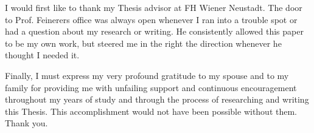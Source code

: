 I would first like to thank my Thesis advisor \advisor{} at FH Wiener Neustadt. 
The door to Prof. Feinerers office was always open whenever I ran into a trouble spot or had a question about my research or writing. 
He consistently allowed this paper to be my own work, but steered me in the right the direction whenever he thought I needed it.

Finally, I must express my very profound gratitude to my spouse and to my family for providing me with unfailing support and continuous encouragement throughout my years of study and through the process of researching and writing this Thesis.
This accomplishment would not have been possible without them. 
Thank you.